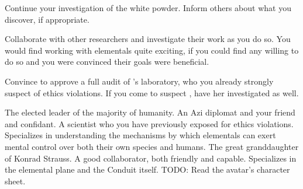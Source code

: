 \documentclass[char]{elementals}
\begin{document}
\begin{itemz}[Goals]
  \item Continue your investigation of the white powder. Inform others about what you discover, if appropriate.
  \item Collaborate with other researchers and investigate their work as you do so. You would find working with elementals quite exciting, if you could find any willing to do so and you were convinced their goals were beneficial.
  \item Convince \cLeader{} to approve a full audit of \cMS{}'s laboratory, who you already strongly suspect of ethics violations. If you come to suspect \cGD{}, have her investigated as well.
\end{itemz}

\begin{contacts}
  \contact{\cLeader{}} The elected leader of the majority of humanity.
	\contact{\cDiplomat{}} An Azi diplomat and your friend and confidant.
	\contact{\cMS{}} A scientist who you have previously exposed for ethics violations. Specializes in understanding the mechanisms by which elementals can exert mental control over both their own species and humans.
	\contact{\cGD{}} The great granddaughter of Konrad Strauss. A good collaborator, both friendly and capable. Specializes in the elemental plane and the Conduit itself.
  \contact{\cAvatar{}} TODO: Read the avatar's character sheet.
\end{contacts}
\end{document}

